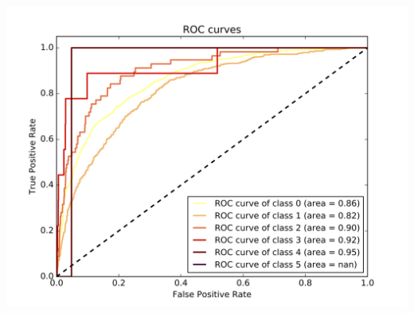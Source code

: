 \documentclass[c]{beamer}
\begin{document}
\begin{frame}
\begin{columns}
\begin{column}{0.6\textwidth}
      \centering\vfill
      \includegraphics[scale=0.18]{../../data/Suisse/test/Neural_Network_Classification-oversampling/Neural_Network_Classification-oversampling_roc.png}
\end{column}
\end{columns}
\end{frame}
\end{document}
